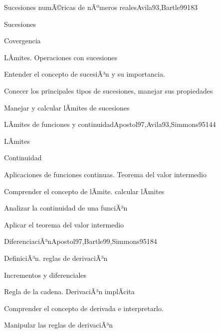 \begin{syllabus}
\begin{unit}{Sucesiones numÃ©ricas de nÃºmeros reales}{Avila93,Bartle99}{18}{3}
   \begin{topics}
      \item Sucesiones
      \item Covergencia
      \item LÃ­mites. Operaciones con sucesiones
   \end{topics}

   \begin{unitgoals}
      \item Entender el concepto de sucesiÃ³n y su importancia.
      \item Conecer los principales tipos de sucesiones, manejar sus propiedades
      \item Manejar y calcular lÃ­mites de sucesiones
      \end{unitgoals}
\end{unit}

\begin{unit}{LÃ­mites de funciones y continuidad}{Apostol97,Avila93,Simmons95}{14}{4}
   \begin{topics}
      \item LÃ­mites
      \item Continuidad
      \item Aplicaciones de funciones continuas. Teorema del valor intermedio
   \end{topics}

   \begin{unitgoals}
      \item Comprender el concepto de lÃ­mite. calcular lÃ­mites
      \item Analizar la continuidad de una funciÃ³n
      \item Aplicar el teorema del valor intermedio
      \end{unitgoals}
\end{unit}

\begin{unit}{DiferenciaciÃ³n}{Apostol97,Bartle99,Simmons95}{18}{4}
   \begin{topics}
      \item DefiniciÃ³n. reglas de derivaciÃ³n
      \item Incrementos y diferenciales
      \item Regla de la cadena. DerivaciÃ³n implÃ­cita
   \end{topics}

   \begin{unitgoals}
      \item Comprender el concepto de derivada e interpretarlo.
      \item Manipular las reglas de derivaciÃ³n
      \end{unitgoals}
\end{unit}


\end{syllabus}
